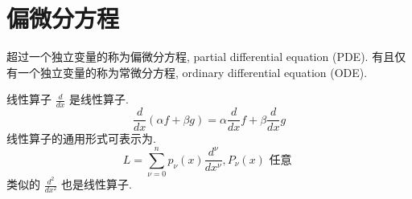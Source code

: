 \chapter{偏微分方程}
超过一个独立变量的称为偏微分方程, partial differential equation (PDE). 有且仅有一个独立变量的称为常微分方程, 
ordinary differential equation (ODE).

线性算子
$\frac{d}{d x}$ 是线性算子.
$$
\frac{d}{d x}(\alpha f+\beta g)=\alpha \frac{d}{d x} f +\beta \frac{d}{d x} g
$$
线性算子的通用形式可表示为.
$$
L=\sum_{\nu=0}^n p_\nu(x) \frac{d^\nu}{d x^\nu}, P_\nu(x) \text { 任意 }
$$
类似的 $\frac{d^2}{d x^2}$ 也是线性算子.



